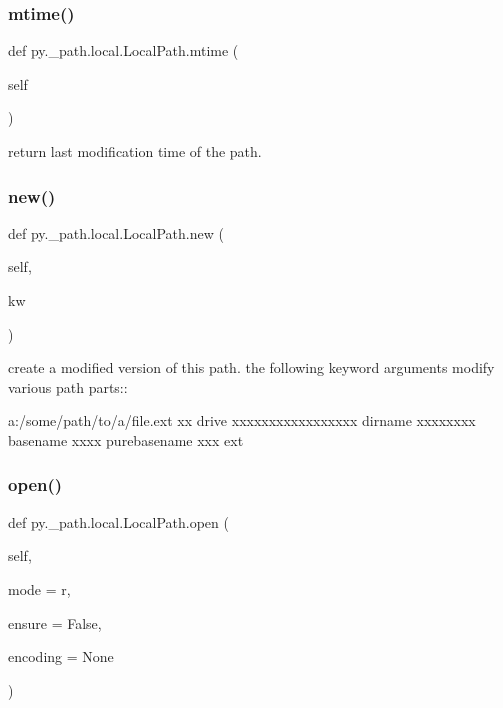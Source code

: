 \subsubsection{\texorpdfstring{mtime()}{mtime()}}
{\footnotesize\ttfamily def py.\+\_\+path.\+local.\+Local\+Path.\+mtime (\begin{DoxyParamCaption}\item[{}]{self }\end{DoxyParamCaption})}

\begin{DoxyVerb}return last modification time of the path. \end{DoxyVerb}
 \mbox{\label{classpy_1_1__path_1_1local_1_1_local_path_af28cfff4089f170f9819bfc0da9512cf}} 
\subsubsection{\texorpdfstring{new()}{new()}}
{\footnotesize\ttfamily def py.\+\_\+path.\+local.\+Local\+Path.\+new (\begin{DoxyParamCaption}\item[{}]{self,  }\item[{}]{kw }\end{DoxyParamCaption})}

\begin{DoxyVerb}create a modified version of this path.
    the following keyword arguments modify various path parts::

      a:/some/path/to/a/file.ext
      xx                           drive
      xxxxxxxxxxxxxxxxx            dirname
                xxxxxxxx   basename
                xxxx       purebasename
                     xxx   ext
\end{DoxyVerb}
 \mbox{\label{classpy_1_1__path_1_1local_1_1_local_path_ab228910748c4f7299bf2a47e4bdaeb08}} 
\subsubsection{\texorpdfstring{open()}{open()}}
{\footnotesize\ttfamily def py.\+\_\+path.\+local.\+Local\+Path.\+open (\begin{DoxyParamCaption}\item[{}]{self,  }\item[{}]{mode = {\ttfamily \textquotesingle{}r\textquotesingle{}},  }\item[{}]{ensure = {\ttfamily False},  }\item[{}]{encoding = {\ttfamily None} }\end{DoxyParamCaption})}

